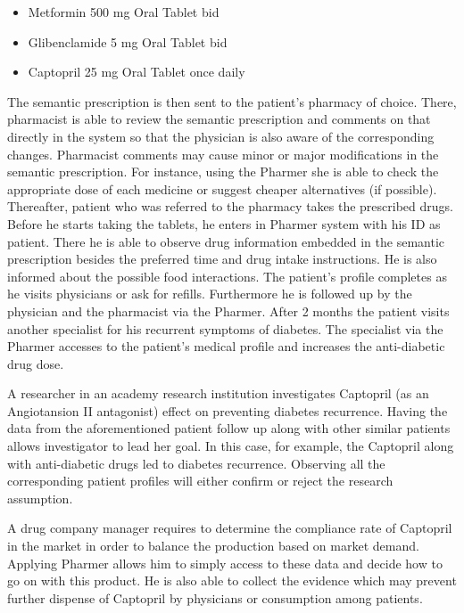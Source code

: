 \documentclass[10pt, conference, compsocconf]{IEEEtran}
\begin{document}
\begin{itemize}
\item {Metformin} 500 mg Oral Tablet bid
\item {Glibenclamide} 5 mg Oral Tablet bid
\item {Captopril} 25 mg Oral Tablet once daily
\end{itemize}

The semantic prescription is then sent to the patient's pharmacy of choice.
There, pharmacist is able to review the semantic prescription and comments on that directly in the system so that the physician is also aware of the corresponding changes.
Pharmacist comments may cause minor or major modifications in the semantic prescription.
For instance, using the Pharmer she is able to check the appropriate dose of each medicine or suggest cheaper alternatives (if possible).
Thereafter, patient who was referred to the pharmacy takes the prescribed drugs.
Before he starts taking the tablets, he enters in Pharmer system with his ID as patient.
There he is able to observe drug information embedded in the semantic prescription besides the preferred time and drug intake instructions.
He is also informed about the possible food interactions.
The patient's profile completes as he visits physicians or ask for refills.
Furthermore he is followed up by the physician and the pharmacist via the Pharmer.
After 2 months the patient visits another specialist for his recurrent symptoms of diabetes.
The specialist via the Pharmer accesses to the patient's medical profile and increases the anti-diabetic drug dose.

A researcher in an academy research institution investigates Captopril (as an Angiotansion II antagonist) effect on preventing diabetes recurrence.
Having the data from the aforementioned patient follow up along with other similar patients allows investigator to lead her goal.
In this case, for example, the Captopril along with anti-diabetic drugs led to diabetes recurrence.
Observing all the corresponding patient profiles will either confirm or reject the research assumption.

 A drug company manager requires to determine the compliance rate of Captopril in the market in order to balance the production based on market demand.
 Applying Pharmer allows him to simply access to these data and decide how to go on with this product.
 He is also able to collect the evidence which may prevent further dispense of Captopril by physicians or consumption among patients.
\end{document}
